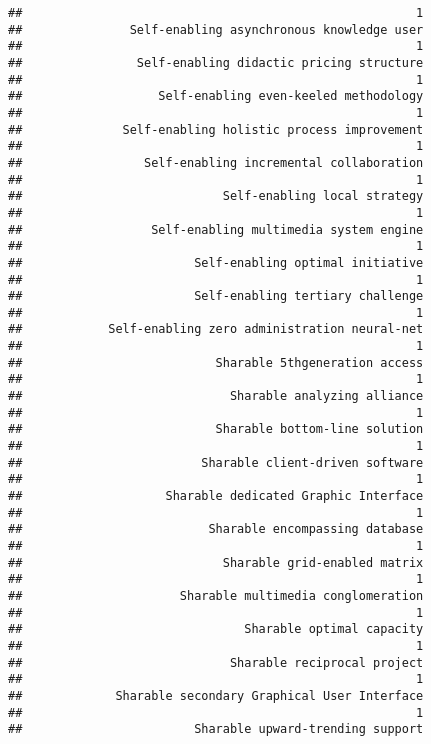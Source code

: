\documentclass[
]{article}
\begin{document}
\begin{verbatim}
##                                                       1 
##               Self-enabling asynchronous knowledge user 
##                                                       1 
##                Self-enabling didactic pricing structure 
##                                                       1 
##                   Self-enabling even-keeled methodology 
##                                                       1 
##              Self-enabling holistic process improvement 
##                                                       1 
##                 Self-enabling incremental collaboration 
##                                                       1 
##                            Self-enabling local strategy 
##                                                       1 
##                  Self-enabling multimedia system engine 
##                                                       1 
##                        Self-enabling optimal initiative 
##                                                       1 
##                        Self-enabling tertiary challenge 
##                                                       1 
##            Self-enabling zero administration neural-net 
##                                                       1 
##                           Sharable 5thgeneration access 
##                                                       1 
##                             Sharable analyzing alliance 
##                                                       1 
##                           Sharable bottom-line solution 
##                                                       1 
##                         Sharable client-driven software 
##                                                       1 
##                    Sharable dedicated Graphic Interface 
##                                                       1 
##                          Sharable encompassing database 
##                                                       1 
##                            Sharable grid-enabled matrix 
##                                                       1 
##                      Sharable multimedia conglomeration 
##                                                       1 
##                               Sharable optimal capacity 
##                                                       1 
##                             Sharable reciprocal project 
##                                                       1 
##             Sharable secondary Graphical User Interface 
##                                                       1 
##                        Sharable upward-trending support 

\end{verbatim}
\end{document}
